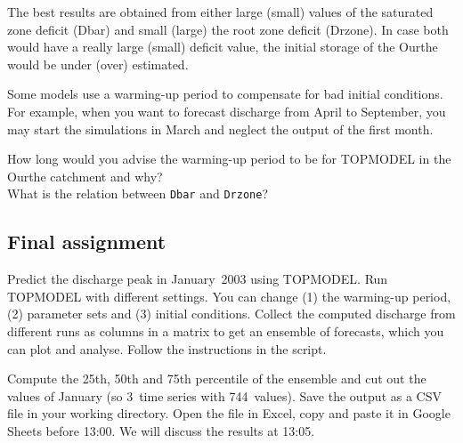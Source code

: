 \documentclass[twocolumn, 10pt, a4paper]{article}
\newenvironment{PC_prac_environment}{
\def\Q{\noindent \color{Gray}\rule[-0.1cm]{\columnwidth}{1.5pt}  \color{black} } \let\ques\Q 
\def\nQ{\noindent \color{black} } \let\ques\nQ 
\def\E{\color{Gray}\rule[0.3cm]{\columnwidth}{1.5pt} \color{black}} \let\ques\E }
\newcommand{\A}[2] { \ifthenelse{\boolean{showanswer}} {\noindent \color{cyan}{#2}\color{black}} {\multido{}{#1}{\noindent \color{light-gray}\hrulefill\\} } }
\begin{document}
\begin{PC_prac_environment}
{The best results are obtained from either large (small) values of the saturated zone deficit (Dbar) and small (large) the root zone deficit (Drzone). In case both would have a really large (small) deficit value, the initial storage of the Ourthe would be under (over) estimated.\\}
\E 

Some models use a warming-up period to compensate for bad initial conditions. For example, when you want to forecast discharge from April to September, you may start the simulations in March and neglect the output of the first month. 

\Q How long would you advise the warming-up period to be for TOPMODEL in the Ourthe catchment and why?\\
\nQ  What is the relation between \texttt{Dbar} and \texttt{Drzone}?\\ 
\E

\subsection{Final assignment}
Predict the discharge peak in January~2003 using TOPMODEL. Run TOPMODEL with different settings. You can change (1) the warming-up period, (2) parameter sets and (3) initial conditions. Collect the computed discharge from different runs as columns in a matrix to get an ensemble of forecasts, which you can plot and analyse. Follow the instructions in the script.

Compute the 25th, 50th and 75th percentile of the ensemble and cut out the values of January (so 3~time series with 744~values). Save the output as a CSV file in your working directory. Open the file in Excel, copy and paste it in Google Sheets before 13:00. We will discuss the results at 13:05.


\end{PC_prac_environment}
\end{document}
